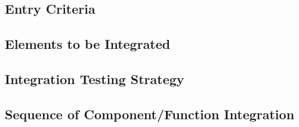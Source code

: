 \subsection{Entry Criteria}

\subsection{Elements to be Integrated}

\subsection{Integration Testing Strategy}

\subsection{Sequence of Component/Function Integration}
